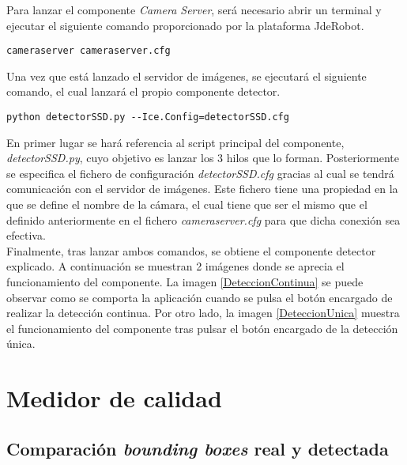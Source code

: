 \documentclass[a4paper, 12pt, spanish, chapterprefix, numbers=noenddot]{book}
\begin{document}
Para lanzar el componente \textit{Camera Server}, será necesario abrir un terminal y ejecutar el siguiente comando proporcionado por la plataforma JdeRobot.\\

\begin{lstlisting}[frame=single]
cameraserver cameraserver.cfg
\end{lstlisting}

Una vez que está lanzado el servidor de imágenes, se ejecutará el siguiente comando, el cual lanzará el propio componente detector.\\

\begin{lstlisting}[frame=single]
python detectorSSD.py --Ice.Config=detectorSSD.cfg
\end{lstlisting}

En primer lugar se hará referencia al script principal del componente, \textit{detectorSSD.py}, cuyo objetivo es lanzar los 3 hilos que lo forman. Posteriormente se especifica el fichero de configuración \textit{detectorSSD.cfg} gracias al cual se tendrá comunicación con el servidor de imágenes. Este fichero tiene una propiedad en la que se define el nombre de la cámara, el cual tiene que ser el mismo que el definido anteriormente en el fichero \textit{cameraserver.cfg} para que dicha conexión sea efectiva.\\

Finalmente, tras lanzar ambos comandos, se obtiene el componente detector explicado. A continuación se muestran 2 imágenes donde se aprecia el funcionamiento del componente. La imagen \ref{DeteccionContinua} se puede observar como se comporta la aplicación cuando se pulsa el botón encargado de realizar la detección continua. Por otro lado, la imagen \ref{DeteccionUnica} muestra el funcionamiento del componente tras pulsar el botón encargado de la detección única.

\chapter{Medidor de calidad}

\section{Comparación \textit{bounding boxes} real y detectada}
\end{document}
